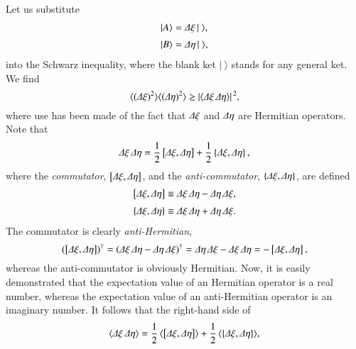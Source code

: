 Let us substitute 
\begin{align}
|A\rangle &= {\mit\Delta} \xi\, |~\rangle,\\[0.5ex]
|B\rangle &= {\mit\Delta} \eta\, |~\rangle,
\end{align}
into the Schwarz inequality, where the blank ket $|~\rangle$ stands for any
general ket. We find
\begin{equation}\label{e2.69}
\langle ({\mit\Delta} \xi)^2\rangle \langle ({\mit\Delta} \eta)^2\rangle \geq |\langle
{\mit\Delta} \xi \,{\mit\Delta} \eta\rangle |^{\,2},
\end{equation}
where use has been made of the fact that ${\mit\Delta} \xi$ and ${\mit\Delta} \eta$ are
Hermitian operators. Note that
\begin{equation}
{\mit\Delta} \xi \,{\mit\Delta} \eta= \frac{1}{2} \left[ {\mit\Delta} \xi, {\mit\Delta} \eta\right]
+\frac{1}{2} \left\{ {\mit\Delta} \xi, {\mit\Delta} \eta\right\},
\end{equation} 
where the {\em commutator}, $\left[ {\mit\Delta} \xi, {\mit\Delta} \eta\right]$,
and the {\em anti-commutator}, 
$\left\{ {\mit\Delta} \xi, {\mit\Delta} \eta\right\}$, are defined
\begin{align}
\left[ {\mit\Delta} \xi, {\mit\Delta} \eta\right]&\equiv {\mit\Delta}\xi \,{\mit\Delta}
\eta -{\mit\Delta} \eta\, {\mit\Delta} \xi,\\[0.5ex]
\left\{ {\mit\Delta} \xi, {\mit\Delta} \eta\right\}&\equiv  {\mit\Delta} \xi\, {\mit\Delta} \eta + 
{\mit\Delta}\eta \, {\mit\Delta}\xi.
\end{align}
The commutator is clearly {\em anti-Hermitian},
\begin{equation}
(\left[ {\mit\Delta} \xi, {\mit\Delta} \eta\right])^{\dag} = ({\mit\Delta}\xi\,
{\mit\Delta}\eta-{\mit\Delta}\eta\,{\mit\Delta}\xi)^{\dag}
= {\mit\Delta}\eta\,{\mit\Delta}\xi-{\mit\Delta}\xi\,
{\mit\Delta}\eta = - \left[ {\mit\Delta} \xi, {\mit\Delta} \eta\right],
\end{equation}
whereas the anti-commutator is obviously Hermitian. Now, it is easily
demonstrated that the expectation value of an Hermitian operator is a real
number, whereas the expectation value of an anti-Hermitian operator is
an imaginary number. It follows that the right-hand side of 
\begin{equation}
\langle{\mit\Delta} \xi \,{\mit\Delta} \eta\rangle= \frac{1}{2} \,
\langle\left[ {\mit\Delta} \xi, {\mit\Delta} \eta\right]\rangle
+\frac{1}{2}\, \langle\left\{ {\mit\Delta} \xi, {\mit\Delta} \eta\right\}\rangle,
\end{equation} 
